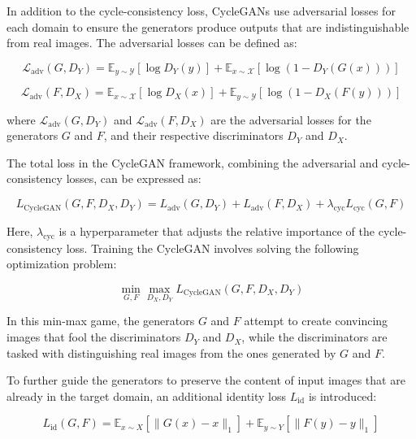 \documentclass[12pt,DIV14,BCOR12mm,a4paper,footinclude=false,headinclude,parskip=half-,twoside,openright,cleardoublepage=empty,toc=index,bibliography=totoc,listof=totoc]{scrreprt}
\numberwithin{equation}{chapter}
\begin{document}
In addition to the cycle-consistency loss, CycleGANs use adversarial losses for each domain to ensure the generators produce outputs that are indistinguishable from real images. The adversarial losses can be defined as:

\begin{equation}
\mathcal{L}_{\text{adv}}(G, D_Y) = \mathbb{E}_{y \sim \mathcal{Y}}[\log D_Y(y)] + \mathbb{E}_{x \sim \mathcal{X}}[\log(1 - D_Y(G(x)))]
\end{equation}

\begin{equation}
\mathcal{L}_{\text{adv}}(F, D_X) = \mathbb{E}_{x \sim \mathcal{X}}[\log D_X(x)] + \mathbb{E}_{y \sim \mathcal{Y}}[\log(1 - D_X(F(y)))]
\end{equation}

where \(\mathcal{L}_{\text{adv}}(G, D_Y)\) and \(\mathcal{L}_{\text{adv}}(F, D_X)\) are the adversarial losses for the generators \(G\) and \(F\), and their respective discriminators \(D_Y\) and \(D_X\).

The total loss in the CycleGAN framework, combining the adversarial and cycle-consistency losses, can be expressed as:

\begin{equation}
L_{\text{CycleGAN}}(G, F, D_X, D_Y) = L_{\text{adv}}(G, D_Y) + L_{\text{adv}}(F, D_X) + \lambda_{\text{cyc}} L_{\text{cyc}}(G, F)
\end{equation}

Here, \(\lambda_{\text{cyc}}\) is a hyperparameter that adjusts the relative importance of the cycle-consistency loss. Training the CycleGAN involves solving the following optimization problem:

\begin{equation}
\min_{G, F} \max_{D_X, D_Y} L_{\text{CycleGAN}}(G, F, D_X, D_Y)
\end{equation}

In this min-max game, the generators \(G\) and \(F\) attempt to create convincing images that fool the discriminators \(D_Y\) and \(D_X\), while the discriminators are tasked with distinguishing real images from the ones generated by \(G\) and \(F\).

To further guide the generators to preserve the content of input images that are already in the target domain, an additional identity loss \(L_{\text{id}}\) is introduced:

\begin{equation}
L_{\text{id}}(G, F) = \mathbb{E}_{x \sim X} [\| G(x) - x \|_1] + \mathbb{E}_{y \sim Y} [\| F(y) - y \|_1]
\end{equation}
\end{document}
